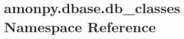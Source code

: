 \hypertarget{namespaceamonpy_1_1dbase_1_1db__classes}{\section{amonpy.\-dbase.\-db\-\_\-classes Namespace Reference}
\label{namespaceamonpy_1_1dbase_1_1db__classes}
}
